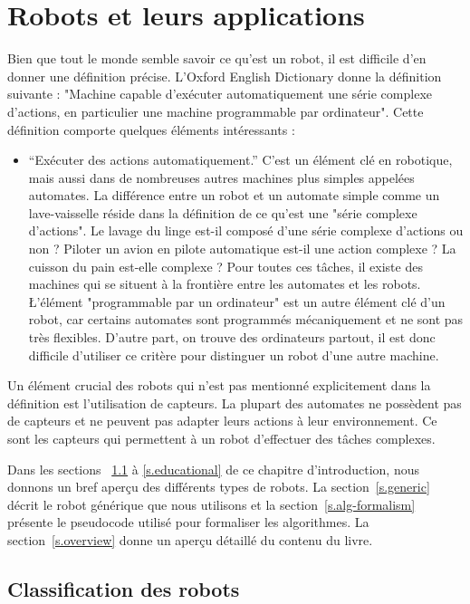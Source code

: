 
\chapter{Robots et leurs applications}\label{ch.basic}

Bien que tout le monde semble savoir ce qu'est un robot, il est difficile d'en donner une définition précise. L'Oxford English Dictionary donne la définition suivante : "Machine capable d'exécuter automatiquement une série complexe d'actions, en particulier une machine programmable par ordinateur". Cette définition comporte quelques éléments intéressants :
\begin{itemize}
\item ``Exécuter des actions automatiquement.'' C'est un élément clé en robotique, mais aussi dans de nombreuses autres machines plus simples appelées automates. La différence entre un robot et un automate simple comme un lave-vaisselle réside dans la définition de ce qu'est une "série complexe d'actions". Le lavage du linge est-il composé d'une série complexe d'actions ou non ? Piloter un avion en pilote automatique est-il une action complexe ? La cuisson du pain est-elle complexe ? Pour toutes ces tâches, il existe des machines qui se situent à la frontière entre les automates et les robots.
\L'élément "programmable par un ordinateur" est un autre élément clé d'un robot, car certains automates sont programmés mécaniquement et ne sont pas très flexibles. D'autre part, on trouve des ordinateurs partout, il est donc difficile d'utiliser ce critère pour distinguer un robot d'une autre machine.
\end{itemize}
Un élément crucial des robots qui n'est pas mentionné explicitement dans la définition est l'utilisation de capteurs. La plupart des automates ne possèdent pas de capteurs et ne peuvent pas adapter leurs actions à leur environnement. Ce sont les capteurs qui permettent à un robot d'effectuer des tâches complexes. 

Dans les sections ~\ref{s.classification} à \ref{s.educational} de ce chapitre d'introduction, nous donnons un bref aperçu des différents types de robots. La section~\ref{s.generic} décrit le robot générique que nous utilisons et la section~\ref{s.alg-formalism} présente le pseudocode utilisé pour formaliser les algorithmes. La section~\ref{s.overview} donne un aperçu détaillé du contenu du livre.

\section{Classification des robots}\label{s.classification}

